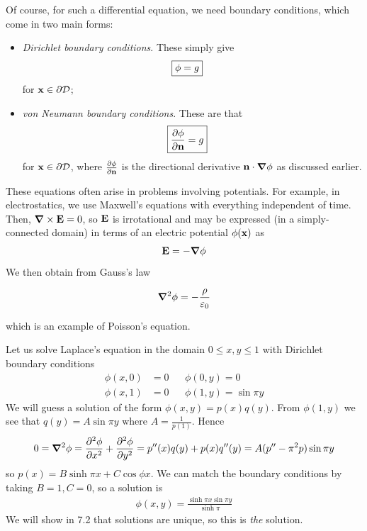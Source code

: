 \documentclass{../template/note}
\begin{document}
    Of course, for such a differential equation, we need boundary conditions, which come in two main forms:
    \begin{itemize}
        \item \emph{Dirichlet boundary conditions}. These simply give
        \begin{align*}
            \Aboxed{\phi = g}
        \end{align*}
        for \(\V x \in \pr \mc D\);
        \item \emph{von Neumann boundary conditions}. These are that
        \begin{align*}
            \Aboxed{\pd{\phi}{\V n} = g}
        \end{align*}
        for \(\V x \in \pr \mc D\), where \(\pd{\phi}{\V n}\) is the directional derivative \(\V n \cdot \grad \phi\) as discussed earlier.        
    \end{itemize}
    
    These equations often arise in problems involving potentials. For example, in electrostatics, we use Maxwell's equations with everything independent of time. Then, \(\curl \V E = 0\), so \(\V E\) is irrotational and may be expressed (in a simply-connected domain) in terms of an electric potential \(\phi(\V x)\) as
    \begin{align*}
        \V E = -\grad \phi
    \end{align*}
    We then obtain from Gauss's law
    \begin{proposition}
        \label{7.1}
        \[
            \grad^2 \phi = -\frac \rho {\eps_0}
        \]
    \end{proposition}
    which is an example of Poisson's equation.
    
    \begin{example*}
        Let us solve Laplace's equation in the domain \(0 \leq x, y \leq 1\) with Dirichlet boundary conditions
        \begin{align*}
            \phi(x, 0) &= 0 && \phi(0, y) = 0 \\
            \phi(x, 1) &= 0 && \phi(1, y) = \sin{\pi y}
        \end{align*}
        We will guess a solution of the form \(\phi(x, y) = p(x)q(y)\). From \(\phi(1, y)\) we see that \(q(y) = A \sin{\pi y}\) where \(A = \frac 1 {p(1)}\). Hence
        \begin{align*}
            0 = \grad^2 \phi = \pd{^2\phi}{x^2} + \pd{^2\phi}{y^2} = p''(x)q(y) + p(x)q''(y) = A(p''-\pi^2p) \sin{\pi y}
        \end{align*}
        so \(p(x) = B \sinh \pi x + C \cos \phi x\). We can match the boundary conditions by taking \(B = 1, C = 0\), so a solution is
        \begin{align*}
            \phi(x, y) = \frac{\sinh \pi x \sin \pi y}{\sinh \pi}
        \end{align*}
        We will show in 7.2 that solutions are unique, so this is \emph{the} solution.
    \end{example*}
    
\end{document}
